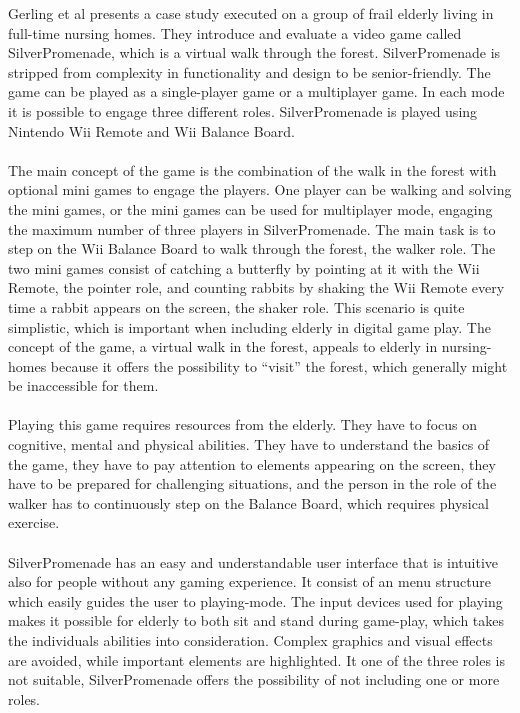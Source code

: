Gerling et al presents a case study executed on a group of frail elderly living in full-time nursing homes. They introduce and evaluate a video game called SilverPromenade, which is a virtual walk through the forest. SilverPromenade is stripped from complexity in functionality and design to be senior-friendly. The game can be played as a single-player game or a multiplayer game. In each mode it is possible to engage three different roles. SilverPromenade is played using Nintendo Wii Remote and Wii Balance Board. \\ \\
The main concept of the game is the combination of the walk in the forest with optional mini games to engage the players. One player can be walking and solving the mini games, or the mini games can be used for multiplayer mode, engaging the maximum number of three players in SilverPromenade. The main task is to step on the Wii Balance Board to walk through the forest, the walker role. The two mini games consist of catching a butterfly by pointing at it with the Wii Remote, the pointer role, and counting rabbits by shaking the Wii Remote every time a rabbit appears on the screen, the shaker role. This scenario is quite simplistic, which is important when including elderly in digital game play. The concept of the game, a virtual walk in the forest, appeals to elderly in nursing-homes because it offers the possibility to “visit” the forest, which generally might be inaccessible for them. \\ \\
Playing this game requires resources from the elderly. They have to focus on cognitive, mental and physical abilities. They have to understand the basics of the game, they have to pay attention to elements appearing on the screen, they have to be prepared for challenging situations, and the person in the role of the walker has to continuously step on the Balance Board, which requires physical exercise. \\ \\
SilverPromenade has an easy and understandable user interface that is intuitive also for people without any gaming experience. It consist of an menu structure which easily guides the user to playing-mode. The input devices used for playing makes it possible for elderly to both sit and stand during game-play, which takes the individuals abilities into consideration. Complex graphics and visual effects are avoided, while important elements are highlighted. It one of the three roles is not suitable, SilverPromenade offers the possibility of not including one or more roles. \\ \\
